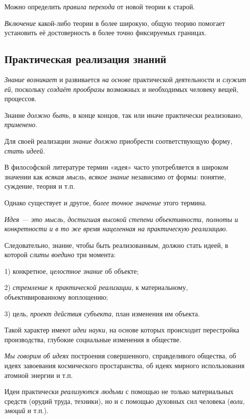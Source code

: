\documentclass[a4paper,14pt,russian]{extreport}
\begin{document}
Можно определить \emph{правила перехода} от новой теории к старой.

\emph{Включение} какой-либо теории в более широкую, общую теорию помогает установить её достоверность в более точно фиксируемых границах.

\subsection{Практическая реализация знаний}

\emph{Знание возникает} и развивается \emph{на основе} практической деятельности и \emph{служит ей}, поскольку \emph{создаёт прообразы} возможных и необходимых человеку вещей, процессов.

Знание \emph{должно быть}, в конце концов, так или иначе практически реализовано, \emph{применено}.

Для своей реализации \emph{знание должно} приобрести соответствующую форму, \emph{стать идеей.}

В философской литературе термин «идея» часто употребляется в широком значении как \emph{всякая мысль}, \emph{всякое знание} независимо от формы: понятие, суждение, теория и т.п.

Однако существует и другое, \emph{более точное значение} этого термина.

\emph{Идея --- это мысль, достигшая высокой степени объективности, полноты и конкретности и в то же время нацеленная на практическую реализацию}.

Следовательно, знание, чтобы быть реализованным, должно стать идеей, в которой \emph{слиты воедино} три момента:

1) конкретное, \emph{целостное знание} об объекте;

2) \emph{стремление к практической реализации}, к материальному, объективированному воплощению;

3) цель, \emph{проект действия субъекта}, план изменения им объекта.

Такой характер имеют \emph{идеи науки}, на основе которых происходит перестройка производства, глубокие социальные изменения в обществе.

\emph{Мы говорим об идеях} построения совершенного, справделивого общества, об идеях завоевания космического простаранства, об идеях мирного использования атомной энергии и т.п.

Идеи практически \emph{реализуются людьми} с помощью не только материальных средств (орудий труда, техники), но и с помощью духовных сил человека (\emph{воли, эмоций} и т.п.).
\end{document}
